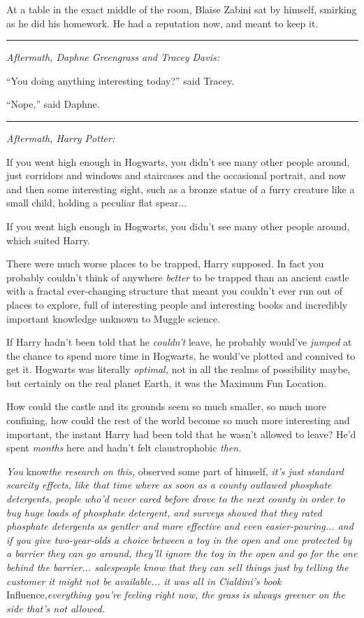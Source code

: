 At a table in the exact middle of the room, Blaise Zabini sat by
himself, smirking as he did his homework. He had a reputation now, and
meant to keep it.

\begin{center}\rule{3in}{0.4pt}\end{center}

\emph{Aftermath, Daphne Greengrass and Tracey Davis:}

``You doing anything interesting today?'' said Tracey.

``Nope,'' said Daphne.

\begin{center}\rule{3in}{0.4pt}\end{center}

\emph{Aftermath, Harry Potter:}

If you went high enough in Hogwarts, you didn't see many other people
around, just corridors and windows and staircases and the occasional
portrait, and now and then some interesting sight, such as a bronze
statue of a furry creature like a small child, holding a peculiar flat
spear...

If you went high enough in Hogwarts, you didn't see many other people
around, which suited Harry.

There were much worse places to be trapped, Harry supposed. In fact you
probably couldn't think of anywhere \emph{better} to be trapped than an
ancient castle with a fractal ever-changing structure that meant you
couldn't ever run out of places to explore, full of interesting people
and interesting books and incredibly important knowledge unknown to
Muggle science.

If Harry hadn't been told that he \emph{couldn't} leave, he probably
would've \emph{jumped} at the chance to spend more time in Hogwarts, he
would've plotted and connived to get it. Hogwarts was literally
\emph{optimal,} not in all the realms of possibility maybe, but
certainly on the real planet Earth, it was the Maximum Fun Location.

How could the castle and its grounds seem so much smaller, so much more
confining, how could the rest of the world become so much more
interesting and important, the instant Harry had been told that he
wasn't allowed to leave? He'd spent \emph{months} here and hadn't felt
claustrophobic \emph{then.}

\emph{You} know\emph{the research on this,} observed some part of
himself, \emph{it's just standard scarcity effects, like that time where
as soon as a county outlawed phosphate detergents, people who'd never
cared before drove to the next county in order to buy huge loads of
phosphate detergent, and surveys showed that they rated phosphate
detergents as gentler and more effective and even easier-pouring...
and if you give two-year-olds a choice between a toy in the open and one
protected by a barrier they can go around, they'll ignore the toy in the
open and go for the one behind the barrier... salespeople know that
they can sell things just by telling the customer it might not be
available... it was all in Cialdini's book}
Influence,\emph{everything you're feeling right now, the grass is always
greener on the side that's not allowed.}

